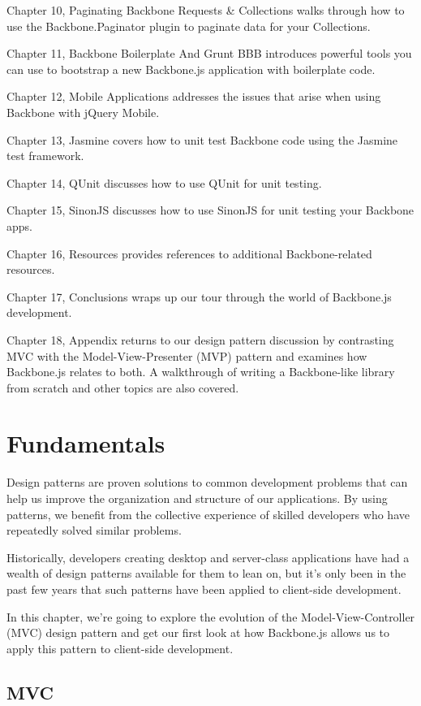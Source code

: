 \documentclass[9pt]{book}
\begin{document}
Chapter 10, Paginating Backbone Requests \& Collections walks through
how to use the Backbone.Paginator plugin to paginate data for your
Collections.

Chapter 11, Backbone Boilerplate And Grunt BBB introduces powerful tools
you can use to bootstrap a new Backbone.js application with boilerplate
code.

Chapter 12, Mobile Applications addresses the issues that arise when
using Backbone with jQuery Mobile.

Chapter 13, Jasmine covers how to unit test Backbone code using the
Jasmine test framework.

Chapter 14, QUnit discusses how to use QUnit for unit testing.

Chapter 15, SinonJS discusses how to use SinonJS for unit testing your
Backbone apps.

Chapter 16, Resources provides references to additional Backbone-related
resources.

Chapter 17, Conclusions wraps up our tour through the world of
Backbone.js development.

Chapter 18, Appendix returns to our design pattern discussion by
contrasting MVC with the Model-View-Presenter (MVP) pattern and examines
how Backbone.js relates to both. A walkthrough of writing a
Backbone-like library from scratch and other topics are also covered.

\section{Fundamentals}\label{fundamentals}

Design patterns are proven solutions to common development problems that
can help us improve the organization and structure of our applications.
By using patterns, we benefit from the collective experience of skilled
developers who have repeatedly solved similar problems.

Historically, developers creating desktop and server-class applications
have had a wealth of design patterns available for them to lean on, but
it's only been in the past few years that such patterns have been
applied to client-side development.

In this chapter, we're going to explore the evolution of the
Model-View-Controller (MVC) design pattern and get our first look at how
Backbone.js allows us to apply this pattern to client-side development.

\subsection{MVC}\label{mvc}
\end{document}
